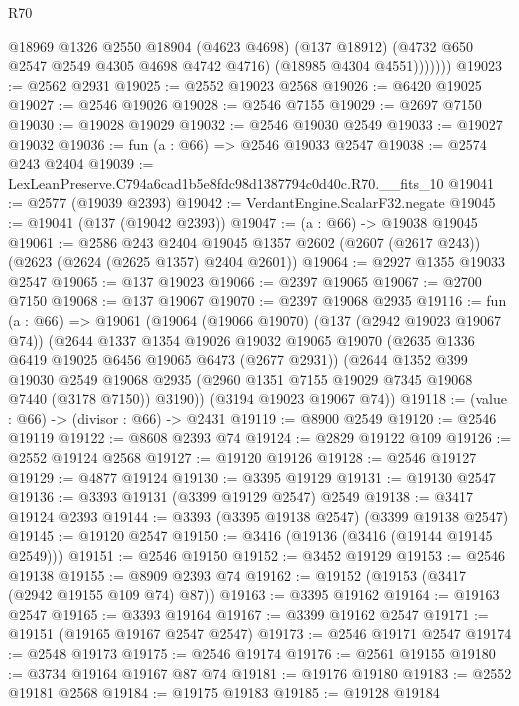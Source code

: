 \begin{lexlean}{R70}
\begin{coremodule}
              @18969
                @1326
                @2550
                @18904
                (@4623 @4698)
                (@137 @18912)
                (@4732 @650 @2547 @2549 @4305 @4698 @4742 @4716)
                (@18985 @4304 @4551)))))))
@19023 := @2562 @2931
@19025 := @2552 @19023 @2568
@19026 := @6420 @19025
@19027 := @2546 @19026
@19028 := @2546 @7155
@19029 := @2697 @7150
@19030 := @19028 @19029
@19032 := @2546 @19030 @2549
@19033 := @19027 @19032
@19036 := fun (a : @66) => @2546 @19033 @2547
@19038 := @2574 @243 @2404
@19039 := LexLeanPreserve.C794a6cad1b5e8fdc98d1387794c0d40c.R70.__fits_10
@19041 := @2577 (@19039 @2393)
@19042 := VerdantEngine.ScalarF32.negate
@19045 := @19041 (@137 (@19042 @2393))
@19047 := (a : @66) -> @19038 @19045
@19061 := @2586
    @243
    @2404
    @19045
    @1357
    @2602
    (@2607 (@2617 @243))
    (@2623 (@2624 (@2625 @1357) @2404 @2601))
@19064 := @2927 @1355 @19033 @2547
@19065 := @137 @19023
@19066 := @2397 @19065
@19067 := @2700 @7150
@19068 := @137 @19067
@19070 := @2397 @19068 @2935
@19116 := fun (a : @66) =>
  @19061
    (@19064
      (@19066 @19070)
      (@137 (@2942 @19023 @19067 @74))
      (@2644
        @1337
        @1354
        @19026
        @19032
        @19065
        @19070
        (@2635 @1336 @6419 @19025 @6456 @19065 @6473 (@2677 @2931))
        (@2644
          @1352
          @399
          @19030
          @2549
          @19068
          @2935
          (@2960 @1351 @7155 @19029 @7345 @19068 @7440 (@3178 @7150))
          @3190))
      (@3194 @19023 @19067 @74))
@19118 := (value : @66) -> (divisor : @66) -> @2431
@19119 := @8900 @2549
@19120 := @2546 @19119
@19122 := @8608 @2393 @74
@19124 := @2829 @19122 @109
@19126 := @2552 @19124 @2568
@19127 := @19120 @19126
@19128 := @2546 @19127
@19129 := @4877 @19124
@19130 := @3395 @19129
@19131 := @19130 @2547
@19136 := @3393 @19131 (@3399 @19129 @2547) @2549
@19138 := @3417 @19124 @2393
@19144 := @3393 (@3395 @19138 @2547) (@3399 @19138 @2547)
@19145 := @19120 @2547
@19150 := @3416 (@19136 (@3416 (@19144 @19145 @2549)))
@19151 := @2546 @19150
@19152 := @3452 @19129
@19153 := @2546 @19138
@19155 := @8909 @2393 @74
@19162 := @19152 (@19153 (@3417 (@2942 @19155 @109 @74) @87))
@19163 := @3395 @19162
@19164 := @19163 @2547
@19165 := @3393 @19164
@19167 := @3399 @19162 @2547
@19171 := @19151 (@19165 @19167 @2547 @2547)
@19173 := @2546 @19171 @2547
@19174 := @2548 @19173
@19175 := @2546 @19174
@19176 := @2561 @19155
@19180 := @3734 @19164 @19167 @87 @74
@19181 := @19176 @19180
@19183 := @2552 @19181 @2568
@19184 := @19175 @19183
@19185 := @19128 @19184

\end{coremodule}
\end{lexlean}

